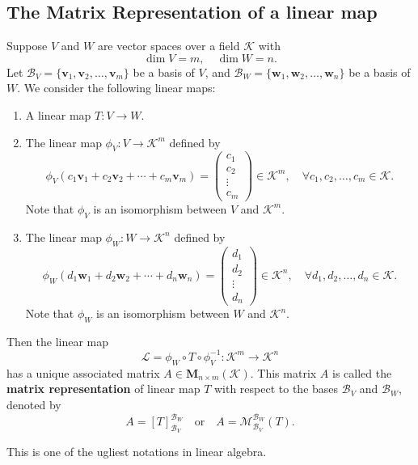 \documentclass{ctexart}
\begin{document}
	\subsection{The Matrix Representation of a linear map}
	\begin{mydef}
		Suppose $V$ and $W$ are vector spaces over a field $\mathcal{K}$ with
		\[
		\dim V = m, \quad \dim W = n.
		\]
		Let $\mathcal{B}_V = \{\mathbf{v}_1, \mathbf{v}_2, \dots, \mathbf{v}_m\}$ be a basis of $V$, and $\mathcal{B}_W = \{\mathbf{w}_1, \mathbf{w}_2, \dots, \mathbf{w}_n\}$ be a basis of $W$. We consider the following linear maps:
		\begin{enumerate}
			\item A linear map $T: V \to W$.
			\item The linear map $\phi_V:V\to \mathcal{K}^m$ defined by
			\[
			\phi_V(c_1 \mathbf{v}_1 + c_2 \mathbf{v}_2 + \cdots + c_m \mathbf{v}_m) =
			\begin{pmatrix}
				c_1 \\ c_2 \\ \vdots \\ c_m
			\end{pmatrix} \in \mathcal{K}^m,
			\quad \forall c_1, c_2, \dots, c_m \in \mathcal{K}.
			\]
			Note that $\phi_V$ is an isomorphism between $V$ and $\mathcal{K}^m$.
			\item The linear map $\phi_W:W \to \mathcal{K}^n$ defined by
			\[
			\phi_W(d_1 \mathbf{w}_1 + d_2 \mathbf{w}_2 + \cdots + d_n \mathbf{w}_n) =
			\begin{pmatrix}
				d_1 \\ d_2 \\ \vdots \\ d_n
			\end{pmatrix} \in \mathcal{K}^n,
			\quad \forall d_1, d_2, \dots, d_n \in \mathcal{K}.
			\]
			Note that $\phi_W$ is an isomorphism between $W$ and $\mathcal{K}^n$.
		\end{enumerate}
		Then the linear map \[ \mathcal{L} = \phi_W \circ T \circ \phi_V^{-1}: \mathcal{K}^m \to \mathcal{K}^n\] has a unique associated matrix $A \in \mathbf{M}_{n \times m}(\mathcal{K})$. This matrix $A$ is called the \textbf{matrix representation} of linear map $T$ with respect to the bases $\mathcal{B}_V$ and $\mathcal{B}_W$, denoted by \[ A=[T]^{\mathcal{B}_W}_{\mathcal{B}_V}\quad \text{or}\quad A=\mathcal{M}^{\mathcal{B}_W}_{\mathcal{B}_V}(T).\]
	\end{mydef}
	\begin{myrmk}
		This is one of the ugliest notations in linear algebra.
	\end{myrmk}
\end{document}
